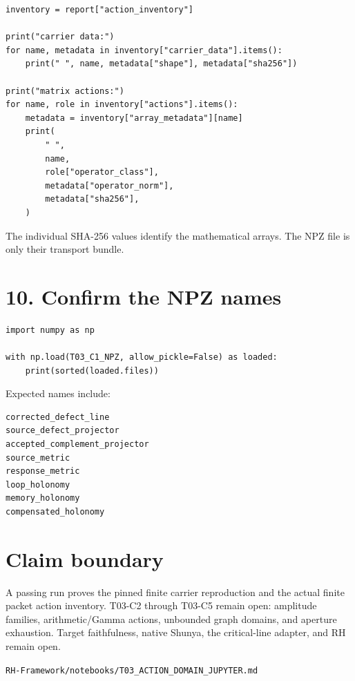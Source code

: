\begin{verbatim}
inventory = report["action_inventory"]

print("carrier data:")
for name, metadata in inventory["carrier_data"].items():
    print(" ", name, metadata["shape"], metadata["sha256"])

print("matrix actions:")
for name, role in inventory["actions"].items():
    metadata = inventory["array_metadata"][name]
    print(
        " ",
        name,
        role["operator_class"],
        metadata["operator_norm"],
        metadata["sha256"],
    )
\end{verbatim}

The individual SHA-256 values identify the mathematical arrays. The NPZ file is
only their transport bundle.

\hypertarget{confirm-the-npz-names}{%
\section{10. Confirm the NPZ names}\label{confirm-the-npz-names}}

\begin{verbatim}
import numpy as np

with np.load(T03_C1_NPZ, allow_pickle=False) as loaded:
    print(sorted(loaded.files))
\end{verbatim}

Expected names include:

\begin{verbatim}
corrected_defect_line
source_defect_projector
accepted_complement_projector
source_metric
response_metric
loop_holonomy
memory_holonomy
compensated_holonomy
\end{verbatim}

\hypertarget{claim-boundary}{%
\section{Claim boundary}\label{claim-boundary}}

A passing run proves the pinned finite carrier reproduction and the actual
finite packet action inventory. T03-C2 through T03-C5 remain open: amplitude
families, arithmetic/Gamma actions, unbounded graph domains, and aperture
exhaustion. Target faithfulness, native Shunya, the critical-line adapter, and
RH remain open.

\begin{flushright}\small\texttt{RH-Framework/notebooks/T03\_ACTION\_DOMAIN\_JUPYTER.md}\end{flushright}
